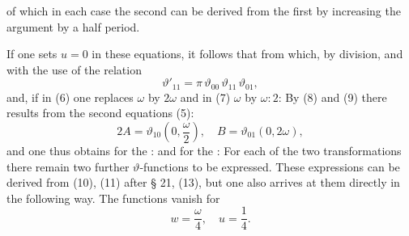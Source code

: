 of which in each case the second can be derived from the first by increasing the argument by a half period.

If one sets $u = 0$ in these equations, it follows that
from which, by division, and with the use of the relation
\[
\vartheta'_{11} = \pi\,\vartheta_{00}\,\vartheta_{11}\,\vartheta_{01},
\]
and, if in (6) one replaces $\omega$ by $2\omega$ and in (7) $\omega$ by $\omega{:}2$:
By (8) and (9) there results from the second equations (5):
\[
2A = \vartheta_{10}\left(0, \frac{\omega}{2}\right), \quad B = \vartheta_{01}(0, 2\omega),
\]
and one thus obtains for the :
and for the :
For each of the two transformations there remain two further $\vartheta$-functions to be expressed. These expressions can be derived from (10), (11) after § 21, (13), but one also arrives at them directly in the following way. The functions
vanish for
\[
w = \frac{\omega}{4}, \quad u = \frac{1}{4}.
\]
